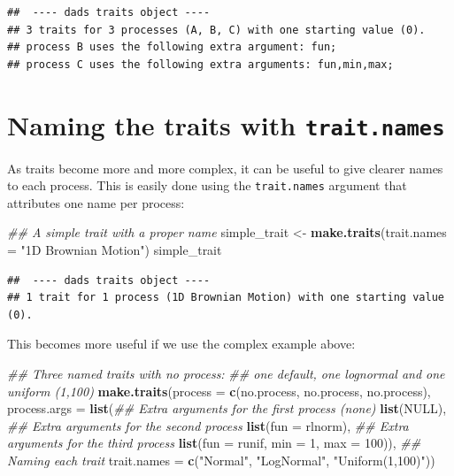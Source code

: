 \documentclass[]{book}
\newenvironment{Shaded}{\begin{snugshade}}{\end{snugshade}}
\newcommand{\CommentTok}[1]{\textcolor[rgb]{0.56,0.35,0.01}{\textit{#1}}}
\newcommand{\DataTypeTok}[1]{\textcolor[rgb]{0.13,0.29,0.53}{#1}}
\newcommand{\DecValTok}[1]{\textcolor[rgb]{0.00,0.00,0.81}{#1}}
\newcommand{\KeywordTok}[1]{\textcolor[rgb]{0.13,0.29,0.53}{\textbf{#1}}}
\newcommand{\NormalTok}[1]{#1}
\newcommand{\OtherTok}[1]{\textcolor[rgb]{0.56,0.35,0.01}{#1}}
\newcommand{\StringTok}[1]{\textcolor[rgb]{0.31,0.60,0.02}{#1}}
\begin{document}
\begin{verbatim}
##  ---- dads traits object ---- 
## 3 traits for 3 processes (A, B, C) with one starting value (0).
## process B uses the following extra argument: fun;
## process C uses the following extra arguments: fun,min,max;
\end{verbatim}

\hypertarget{naming-the-traits-with-trait.names}{%
\section{\texorpdfstring{Naming the traits with \texttt{trait.names}}{Naming the traits with trait.names}}\label{naming-the-traits-with-trait.names}}

As traits become more and more complex, it can be useful to give clearer names to each process.
This is easily done using the \texttt{trait.names} argument that attributes one name per process:

\begin{Shaded}
\begin{Highlighting}[]
\CommentTok{## A simple trait with a proper name}
\NormalTok{simple_trait <-}\StringTok{ }\KeywordTok{make.traits}\NormalTok{(}\DataTypeTok{trait.names =} \StringTok{"1D Brownian Motion"}\NormalTok{)}
\NormalTok{simple_trait}
\end{Highlighting}
\end{Shaded}

\begin{verbatim}
##  ---- dads traits object ---- 
## 1 trait for 1 process (1D Brownian Motion) with one starting value (0).
\end{verbatim}

This becomes more useful if we use the complex example above:

\begin{Shaded}
\begin{Highlighting}[]
\CommentTok{## Three named traits with no process:}
\CommentTok{## one default, one lognormal and one uniform (1,100)}
\KeywordTok{make.traits}\NormalTok{(}\DataTypeTok{process      =} \KeywordTok{c}\NormalTok{(no.process, no.process, no.process),}
            \DataTypeTok{process.args =} \KeywordTok{list}\NormalTok{(}\CommentTok{## Extra arguments for the first process (none)}
                                \KeywordTok{list}\NormalTok{(}\OtherTok{NULL}\NormalTok{),}
                                \CommentTok{## Extra arguments for the second process}
                                \KeywordTok{list}\NormalTok{(}\DataTypeTok{fun =}\NormalTok{ rlnorm),}
                                \CommentTok{## Extra arguments for the third process}
                                \KeywordTok{list}\NormalTok{(}\DataTypeTok{fun =}\NormalTok{ runif, }\DataTypeTok{min =} \DecValTok{1}\NormalTok{, }\DataTypeTok{max =} \DecValTok{100}\NormalTok{)),}
            \CommentTok{## Naming each trait}
            \DataTypeTok{trait.names  =} \KeywordTok{c}\NormalTok{(}\StringTok{"Normal"}\NormalTok{, }\StringTok{"LogNormal"}\NormalTok{, }\StringTok{"Uniform(1,100)"}\NormalTok{))}
\end{Highlighting}
\end{Shaded}
\end{document}
